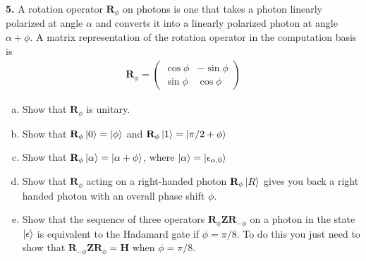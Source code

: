 \documentclass{book}
\theoremstyle{definition}
\newcommand{\al}{\alpha}
\newcommand{\Z}{\mathbf{Z}}
\newcommand{\had}{\mathbf{H}}
\begin{document}
\newpage















\noindent \textbf{5.} A rotation operator $\mathbf{R}_\phi$ on photons is one that takes a photon linearly polarized at angle $\alpha$ and converts it into a linearly polarized photon at angle $\al+\phi$. A matrix representation of the rotation operator in the computation basis is
\begin{align}
\mathbf{R}_\phi = \begin{pmatrix}
\cos\phi & -\sin\phi \\ \sin\phi & \cos\phi
\end{pmatrix}
\end{align}
\begin{enumerate}[(a)]
	\item Show that $\mathbf{R}_\phi$ is unitary.
	\item Show that $\mathbf{R}_\phi\ket{0} = \ket{\phi}$ and $\mathbf{R}_\phi \ket{1} = \ket{\pi/2+ \phi}$
	\item Show that $\mathbf{R}_\phi \ket{\al} = \ket{\al + \phi}$, where $\ket{\al} = \ket{\epsilon_{\alpha,0}}$
	\item Show that $\mathbf{R}_\phi$ acting on a right-handed photon $\mathbf{R}_\phi\ket{R}$ gives you back a right handed photon with an overall phase shift $\phi$.
	\item Show that the sequence of three operators $\mathbf{R}_{\phi}\Z \mathbf{R}_{-\phi}$ on a photon in the state $\ket{\epsilon}$ is equivalent to the Hadamard gate if $\phi = \pi/8$. To do this you just need to show that $\mathbf{R}_{-\phi}\Z \mathbf{R}_\phi = \had$ when $\phi = \pi/8$. 
\end{enumerate}
\end{document}
